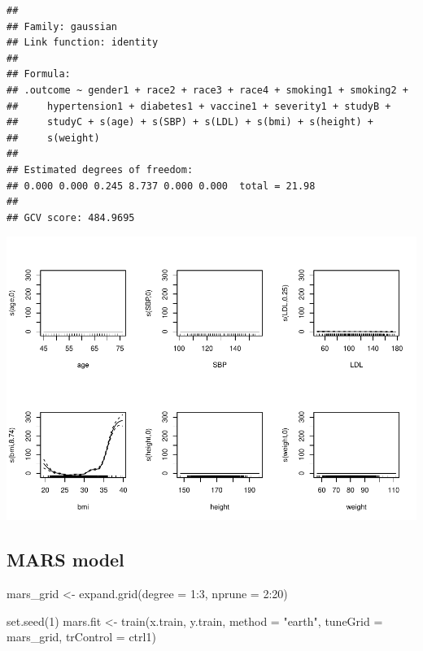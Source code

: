 \documentclass[
]{article}
\newenvironment{Shaded}{\begin{snugshade}}{\end{snugshade}}
\newcommand{\AttributeTok}[1]{\textcolor[rgb]{0.77,0.63,0.00}{#1}}
\newcommand{\DecValTok}[1]{\textcolor[rgb]{0.00,0.00,0.81}{#1}}
\newcommand{\FunctionTok}[1]{\textcolor[rgb]{0.00,0.00,0.00}{#1}}
\newcommand{\NormalTok}[1]{#1}
\newcommand{\OtherTok}[1]{\textcolor[rgb]{0.56,0.35,0.01}{#1}}
\newcommand{\SpecialCharTok}[1]{\textcolor[rgb]{0.00,0.00,0.00}{#1}}
\newcommand{\StringTok}[1]{\textcolor[rgb]{0.31,0.60,0.02}{#1}}
\begin{document}
\begin{verbatim}
## 
## Family: gaussian 
## Link function: identity 
## 
## Formula:
## .outcome ~ gender1 + race2 + race3 + race4 + smoking1 + smoking2 + 
##     hypertension1 + diabetes1 + vaccine1 + severity1 + studyB + 
##     studyC + s(age) + s(SBP) + s(LDL) + s(bmi) + s(height) + 
##     s(weight)
## 
## Estimated degrees of freedom:
## 0.000 0.000 0.245 8.737 0.000 0.000  total = 21.98 
## 
## GCV score: 484.9695
\end{verbatim}

\begin{Shaded}
\end{Shaded}

\includegraphics{DSII_final_js5095_files/figure-latex/unnamed-chunk-9-1.pdf}

\hypertarget{mars-model}{%
\subsection{MARS model}\label{mars-model}}

\begin{Shaded}
\begin{Highlighting}[]
\NormalTok{mars\_grid }\OtherTok{\textless{}{-}} \FunctionTok{expand.grid}\NormalTok{(}\AttributeTok{degree =} \DecValTok{1}\SpecialCharTok{:}\DecValTok{3}\NormalTok{, }
                         \AttributeTok{nprune =} \DecValTok{2}\SpecialCharTok{:}\DecValTok{20}\NormalTok{)}

\FunctionTok{set.seed}\NormalTok{(}\DecValTok{1}\NormalTok{)}
\NormalTok{mars.fit }\OtherTok{\textless{}{-}} \FunctionTok{train}\NormalTok{(x.train, y.train,}
                  \AttributeTok{method =} \StringTok{"earth"}\NormalTok{,}
                  \AttributeTok{tuneGrid =}\NormalTok{ mars\_grid,}
                  \AttributeTok{trControl =}\NormalTok{ ctrl1)}
\end{Highlighting}
\end{Shaded}
\end{document}
